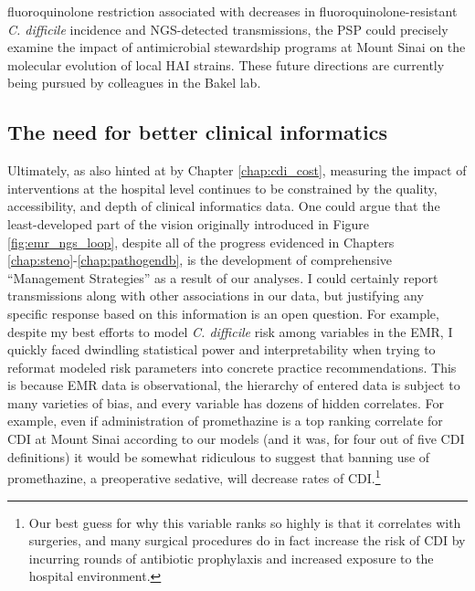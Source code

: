 fluoroquinolone restriction associated with decreases in fluoroquinolone-resistant \emph{C. difficile} incidence and NGS-detected transmissions\autocite{Dingle2017}, the PSP could precisely examine the impact of antimicrobial stewardship programs at Mount Sinai on the molecular evolution of local HAI strains. These future directions are currently being pursued by colleagues in the Bakel lab.

\subsection{The need for better clinical informatics}

Ultimately, as also hinted at by Chapter \ref{chap:cdi_cost}, measuring the impact of interventions at the hospital level continues to be constrained by the quality, accessibility, and depth of clinical informatics data. One could argue that the least-developed part of the vision originally introduced in Figure \ref{fig:emr_ngs_loop}, despite all of the progress evidenced in Chapters \ref{chap:steno}-\ref{chap:pathogendb}, is the development of comprehensive ``Management Strategies'' as a result of our analyses. I could certainly report transmissions along with other associations in our data, but justifying any specific response based on this information is an open question. For example, despite my best efforts to model \emph{C. difficile} risk among variables in the EMR, I quickly faced dwindling statistical power and interpretability when trying to reformat modeled risk parameters into concrete practice recommendations. This is because EMR data is observational, the hierarchy of entered data is subject to many varieties of bias, and every variable has dozens of hidden correlates. For example, even if administration of promethazine is a top ranking correlate for CDI at Mount Sinai according to our models (and it was, for four out of five CDI definitions) it would be somewhat ridiculous to suggest that banning use of promethazine, a preoperative sedative, will decrease rates of CDI.\footnote{Our best guess for why this variable ranks so highly is that it correlates with surgeries, and many surgical procedures do in fact increase the risk of CDI by incurring rounds of antibiotic prophylaxis and increased exposure to the hospital environment.}

